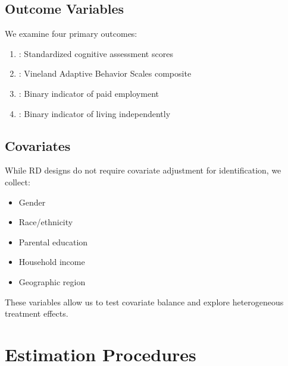\documentclass[letterpaper,10pt,english]{jupyterBook}
\begin{document}
\subsection{Outcome Variables}
\label{\detokenize{methodology:outcome-variables}}
\sphinxAtStartPar
We examine four primary outcomes:
\begin{enumerate}
%
\item {} 
\sphinxAtStartPar
{}: Standardized cognitive assessment scores

\item {} 
\sphinxAtStartPar
{}: Vineland Adaptive Behavior Scales composite

\item {} 
\sphinxAtStartPar
{}: Binary indicator of paid employment

\item {} 
\sphinxAtStartPar
{}: Binary indicator of living independently

\end{enumerate}


\subsection{Covariates}
\label{\detokenize{methodology:covariates}}
\sphinxAtStartPar
While RD designs do not require covariate adjustment for identification, we collect:
\begin{itemize}
\item {} 
\sphinxAtStartPar
Gender

\item {} 
\sphinxAtStartPar
Race/ethnicity

\item {} 
\sphinxAtStartPar
Parental education

\item {} 
\sphinxAtStartPar
Household income

\item {} 
\sphinxAtStartPar
Geographic region

\end{itemize}

\sphinxAtStartPar
These variables allow us to test covariate balance and explore heterogeneous treatment effects.


\section{Estimation Procedures}
\label{\detokenize{methodology:estimation-procedures}}
\end{document}
